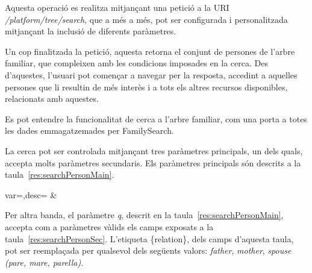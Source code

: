         Aquesta operació es realitza mitjançant una petició a la URI \emph{/platform/tree/search}, que a més a més, pot ser configurada i personalitzada mitjançant la inclusió de di\-fe\-rents paràmetres.

        Un cop finalitzada la petició, aquesta retorna el conjunt de persones de l'arbre familiar, que compleixen amb les condicions imposades en la cerca. Des d'aquestes, l'usuari pot començar a navegar per la resposta, accedint a aquelles persones que li resultin de més interès i a tots els altres recursos disponibles, relacionats amb aquestes.

        Es pot entendre la funcionalitat de cerca a l'arbre familiar, com una porta a totes les dades emmagatzemades per FamilySearch.

        La cerca pot ser controlada mitjançant tres paràmetres principals, un dels quals, accepta molts paràmetres secundaris. Els paràmetres principals són descrits a la taula~\ref{res:searchPersonMain}.

        \begin{center}
                 {var=\var,desc=\desc}
                 {\var&\desc}
         \end{center}

         Per altra banda, el paràmetre \emph{q}, descrit en la taula~\ref{res:searchPersonMain}, accepta com a paràmetres vàlids els camps exposats a la taula~\ref{res:searchPersonSec}. L'etiqueta \{relation\}, dels camps d'aquesta taula,  pot ser reemplaçada per qualsevol dels següents valors: \emph{father}, \emph{mother}, \emph{spouse} \emph{(pare, mare, parella)}.


